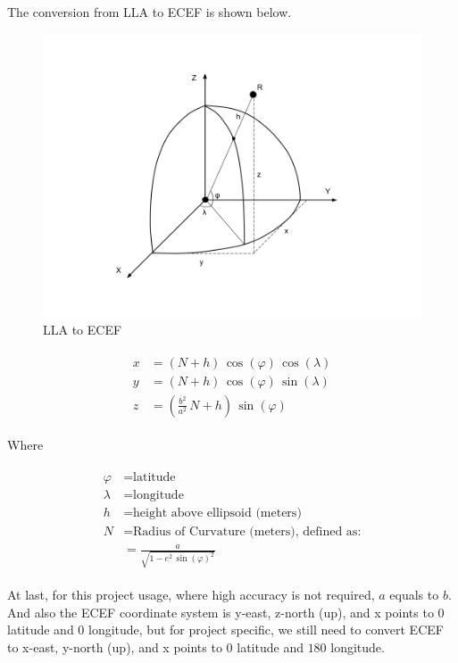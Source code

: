 The conversion from LLA to ECEF is shown below.

\begin{figure}[H]
\centering
\includegraphics[width=\linewidth]{Figures/lla2ecef.png}
\decoRule
\caption[lla2ecef]{LLA to ECEF}
\end{figure}

\[
\begin{array}{lr}
\begin{aligned}
x &= (N + h)\,\cos(\varphi)\,\cos(\lambda) \\
y &= (N + h)\,\cos(\varphi)\,\sin(\lambda) \\
z &= (\frac{b^2}{a^2}\,N + h)\,\sin(\varphi)
\end{aligned}
\end{array}
\]

Where

\[
\begin{array}{lr}
\begin{aligned}
\varphi &= \text{latitude} \\
\lambda &= \text{longitude} \\
h &= \text{height above ellipsoid (meters)} \\
N &= \text{Radius of Curvature (meters), defined as:} \\
&= \frac{a}{\sqrt{1 - e^2\,\sin(\varphi)^2}}
\end{aligned}
\end{array}
\]

At last, for this project usage, where high accuracy is not required, $a$ equals to $b$. And also the ECEF coordinate system is y-east, z-north (up), and x points to $0$ latitude and $0$ longitude, but for project specific, we still need to convert ECEF to x-east, y-north (up), and x points to $0$ latitude and $180$ longitude.

